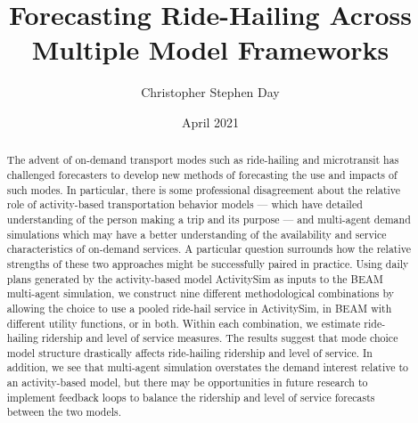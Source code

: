 \documentclass[fancy, masters]{byuthesis}
\title{Forecasting Ride-Hailing Across\\
\hspace*{0.333em}Multiple Model Frameworks}
\author{Christopher Stephen Day}
\date{April 2021}
\begin{document}
	\frontmatter

	\titlepage
	\clearpage

	\customtitlepage
	\clearpage


    \begin{abstract}
  The advent of on-demand transport modes such as ride-hailing and microtransit has challenged forecasters to develop new methods of forecasting the use and impacts of such modes. In particular, there is some professional disagreement about the relative role of activity-based transportation behavior models --- which have detailed understanding of the person making a trip and its purpose --- and multi-agent demand simulations which may have a better understanding of the availability and service characteristics of on-demand services. A particular question surrounds how the relative strengths of these two approaches might be successfully paired in practice. Using daily plans generated by the activity-based model ActivitySim as inputs to the BEAM multi-agent simulation, we construct nine different methodological combinations by allowing the choice to use a pooled ride-hail service in ActivitySim, in BEAM with different utility functions, or in both. Within each combination, we estimate ride-hailing ridership and level of service measures. The results suggest that mode choice model structure drastically affects ride-hailing ridership and level of service. In addition, we see that multi-agent simulation overstates the demand interest relative to an activity-based model, but there may be opportunities in future research to implement feedback loops to balance the ridership and level of service forecasts between the two models.
  \end{abstract}
  	\clearpage
\end{document}
